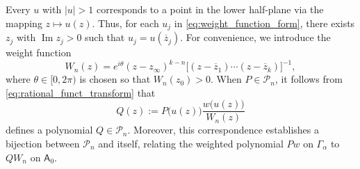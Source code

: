 \documentclass[12pt,oneside,reqno]{amsart}
\theoremstyle{definition}
\numberwithin{equation}{section}
\newcommand{\bbH}{{\mathbb H}}
\newcommand{\sfA}{\mathsf{A}}
\newcommand{\cP}{{\mathcal{P}}}
\renewcommand{\Im}{\operatorname{Im}}
\begin{document}
Every $u$ with $|u|>1$ corresponds to a point in the lower half-plane via the mapping $z\mapsto u(z)$. Thus, for each $u_j$ in \eqref{eq:weight_function_form}, there exists $z_j$ with $\Im z_j>0$ such that $u_j = u(\overline{z}_j)$. %
For convenience, we introduce the weight function
\begin{equation}
	W_n(z) = e^{i\theta}(z-z_\infty)^{k-n}\bigl[(z-\overline{z}_1)\cdots (z-\overline{z}_k)\bigr]^{-1},
	\label{eq:transfered_weight}
\end{equation}
where $\theta\in [0,2\pi)$ is chosen so that $W_n(z_0)>0$. When $P \in \cP_n$, it follows from \eqref{eq:rational_funct_transform} that
\[ Q(z) := P\bigl(u(z)\bigr)\frac{w\bigl(u(z)\bigr)}{W_n(z)} \]
defines a polynomial $Q \in \cP_n$. Moreover, this correspondence establishes a bijection between $\cP_n$ and itself, relating the weighted polynomial $Pw$ on $\Gamma_\alpha$ to $QW_n$ on $\sfA_0$.
\end{document}
